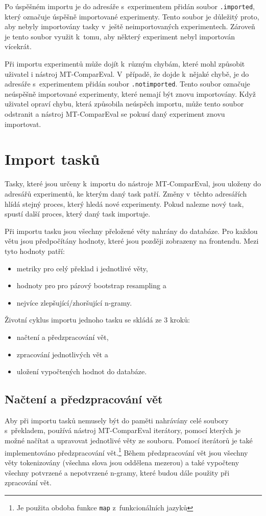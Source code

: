 Po úspěšném importu je do adresáře s~experimentem přidán soubor \texttt{.imported},
  který označuje úspěšně importované experimenty.
Tento soubor je důležitý proto,
  aby nebyly importovány tasky v~ještě neimportovaných experimentech.
Zároveň  je tento soubor využit k~tomu,
  aby některý experiment nebyl importován vícekrát.

Při importu experimentů může dojít k~různým chybám,
  které mohl způsobit uživatel i nástroj \mbox{MT-ComparEval}.
V~případě, že dojde k~nějaké chybě,
  je do adresáře s~experimentem přidán soubor \texttt{.notimported}.
Tento soubor označuje neúspěšně importované experimenty, 
  které nemají být znovu importovány.
Když uživatel opraví chybu,
  která způsobila neúspěch importu,
  může tento soubor odstranit
  a nástroj \mbox{MT-ComparEval} se pokusí daný experiment znovu importovat.


\section{Import tasků}
Tasky, které jsou určeny k~importu do nástroje \mbox{MT-ComparEval},
  jsou uloženy do adresářů experimentů,
  ke kterým daný task patří.
Změny v~těchto adresářích hlídá stejný proces,
  který hledá nové experimenty.
Pokud nalezne nový task,
  spustí další proces,
  který daný task importuje.

Při importu tasku jsou všechny přeložené věty nahrány do databáze.
Pro každou větu jsou předpočítány hodnoty,
  které jsou později zobrazeny na frontendu.
Mezi tyto hodnoty patří:
\begin{itemize}
	\item metriky pro celý překlad i jednotlivé věty,
	\item hodnoty pro pro párový bootstrap resampling a
	\item nejvíce zlepšující/zhoršující \mbox{n-gramy}.
\end{itemize}

Životní cyklus importu jednoho tasku se skládá ze 3 kroků:
\begin{itemize}
	\item načtení a předzpracování vět,
	\item zpracování jednotlivých vět a
	\item uložení vypočtených hodnot do databáze.
\end{itemize}

\subsection{Načtení a předzpracování vět}
Aby při importu tasků nemusely být do paměti nahrávány celé soubory s~překladem,
  používá nástroj \mbox{MT-ComparEval} iterátory,
  pomocí kterých je možné načítat a upravovat jednotlivé věty ze souboru.
Pomocí iterátorů je také implementováno předzpracování vět.\footnote{Je použita obdoba funkce \texttt{map} z~funkcionálních jazyků}
Během předzpracování vět jsou všechny věty tokenizovány (všechna slova jsou oddělena mezerou) a
také vypočteny všechny potvrzené a nepotvrzené \mbox{n-gramy},
  které budou dále použity při zpracování vět.

